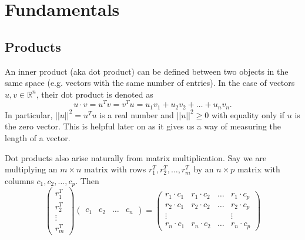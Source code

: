 \documentclass[11pt]{article}
\theoremstyle{plain} %
\theoremstyle{definition}
\theoremstyle{remark}
\begin{document}
\clearpage

\section{Fundamentals}

\subsection{Products}

An inner product (aka dot product) can be defined between two objects in the same space (e.g. vectors with the same number of entries). In the case of vectors $u, v \in \mathbb{R}^n$, their dot product is denoted as $$u\cdot v = u^Tv = v^Tu = u_1v_1 + u_2v_2 + \ldots + u_nv_n.$$
In particular, $||u||^2 = u^Tu$ is a real number and $||u||^2 \ge 0$ with equality only if $u$ is the zero vector. This is helpful later on as it gives us a way of measuring the length of a vector.

Dot products also arise naturally from matrix multiplication. Say we are multiplying an $m\times n$ matrix with rows $r_1^T, r_2^T, \ldots, r_m^T$ by an $n\times p$ matrix with columns $c_1, c_2, \ldots, c_p$. Then
$$\begin{pmatrix}r_1^T\\r_2^T\\\vdots\\r_m^T\end{pmatrix}\begin{pmatrix}c_1 & c_2 & \ldots & c_n\end{pmatrix} = \begin{pmatrix}r_1\cdot c_1 & r_1 \cdot c_2 & \ldots & r_1 \cdot c_p\\ r_2 \cdot c_1 & r_2 \cdot c_2 & \ldots & r_2\cdot c_p\\ \vdots &&&\vdots\\ r_n\cdot c_1 & r_n \cdot c_2 & \ldots & r_n \cdot c_p\end{pmatrix}$$
\end{document}
